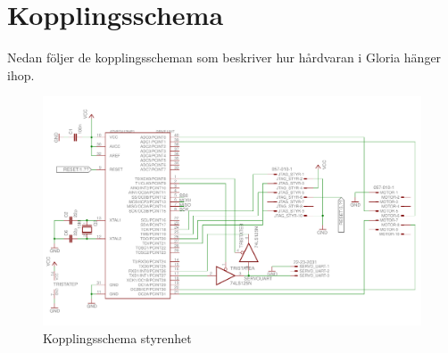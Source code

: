 \section{Kopplingsschema}

Nedan följer de kopplingsscheman som beskriver hur hårdvaran i Gloria hänger ihop.

\begin{figure}[h!]
	\centering
	\includegraphics[scale=0.5]{grafik/kopplingsschema-drive_unit}
	\caption{Kopplingsschema styrenhet} \label{kopplingsschema-styrenhet}
\end{figure}

